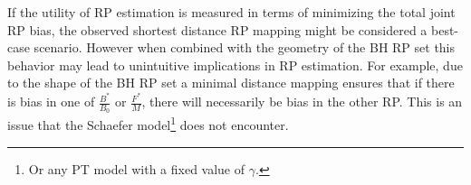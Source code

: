 %
If the utility of RP estimation is measured in terms of minimizing the total 
joint RP bias, the observed shortest distance RP mapping might be considered 
a best-case scenario. %
However when combined with the geometry of the BH RP set this behavior may 
lead to unintuitive implications in RP estimation.
For example, due to the shape of the BH RP set a minimal distance mapping
ensures that if there is bias in one of $\frac{B^*}{B_0}$ or $\frac{F^*}{M}$, 
there will necessarily be bias in the other RP. This is an issue that the 
Schaefer model\footnote{Or any PT model with a fixed value of $\gamma$.} 
does not encounter.  


